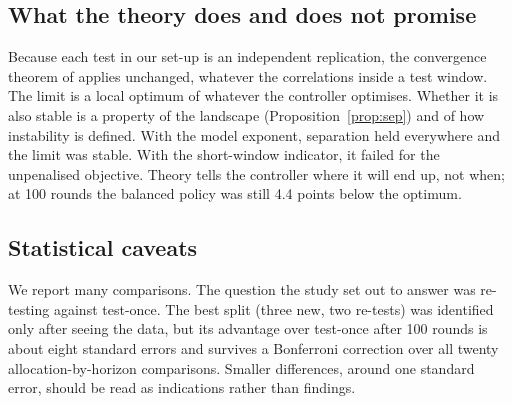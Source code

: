 \documentclass[11pt,a4paper]{article}
\begin{document}
\subsection{What the theory does and does not promise}
Because each test in our set-up is an independent replication, the convergence theorem of \citet{kuras2026when} applies unchanged, whatever the correlations inside a test window. The limit is a local optimum of whatever the controller optimises. Whether it is also stable is a property of the landscape (Proposition~\ref{prop:sep}) and of how instability is defined. With the model exponent, separation held everywhere and the limit was stable. With the short-window indicator, it failed for the unpenalised objective. Theory tells the controller where it will end up, not when; at 100 rounds the balanced policy was still 4.4 points below the optimum.

\subsection{Statistical caveats}
We report many comparisons. The question the study set out to answer was re-testing against test-once. The best split (three new, two re-tests) was identified only after seeing the data, but its advantage over test-once after 100 rounds is about eight standard errors and survives a Bonferroni correction over all twenty allocation-by-horizon comparisons. Smaller differences, around one standard error, should be read as indications rather than findings.
\end{document}
